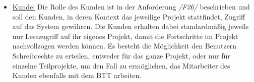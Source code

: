 \begin{itemize}
    \item[] \underline{Kunde:} Die Rolle des Kunden ist in der Anforderung \emph{/F26/} beschrieben und soll den Kunden, in deren Kontext das jeweilige Projekt stattfindet, Zugriff auf das System gewähren. Die Kunden erhalten dabei standardmäßig jeweils nur Lesezugriff auf ihr eigenes Projekt, damit die Fortschritte im Projekt nachvollzogen werden können. Es besteht die Möglichkeit den Benutzern Schreibrechte zu erteilen, entweder für das ganze Projekt, oder nur für einzelne Teilprojekte, um den Fall zu ermöglichen, das Mitarbeiter des Kunden ebenfalls mit dem BTT arbeiten.  

\end{itemize}

\begin{comment}
        
In dem nun folgendem Kapitel wird die Anforderungsanalyse behandelt. Orientiert wird sich dazu an dem Vorgehensmodell von Helmut Balzert, das ausführlich in dem Modul BIS-134 Anforderungsanalyse des Studiengangs Wirtschaftsinformatik der Hochschule Hannover behandelt wurde.\\Die Anforderungsanalyse ist einer der ersten Schritte im Softwareentwicklungsprozess und hat zum Ziel die Anforderungen zu ermitteln, die das System, in diesem Fall der Business Transformation Tracker, leisten soll, sowie diese zu definieren. Dadurch soll eine größtmögliche Abdeckung der gestellten Anforderungen erreicht werden und Unstimmigkeiten mit dem Kunden, bzw. dem Auftraggeber, in Bezug auf Funktion und Umfang, vermieden werden. Im Wasserfallmodell nach Balzert ist die Anforderungsanalyse in der Definitionsphase verortert und arbeitet somit mit den Ergebnisobjekten der vorangegangenen Planungsphase. \footcite[Vgl.][S. 100 ff.]{balzert} Die Ergebnisse der Anforderungsanalyse werden dem anschließenden Kapitel, der Konzeption und somit der Entwurfsphase, als Basis dienen.\\
Im Rahmen dieser    Darstellung in UML


\subsection{Ermittlung der Anforderungen}
Im nachfolgendem Kapitel werden die Anforderungen an die Software, die sich aus der Problemstellung und Gesprächen mit dem Auftraggeber ergeben haben, genauer spezifiziert. Im Anschluss folgen dann die zusätzlichen Anforderungen, die sich aus der Umfrage ergeben haben.


\end{comment}
